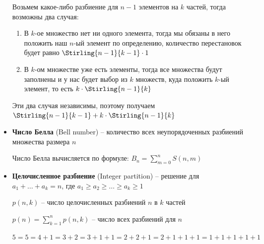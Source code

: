 \documentclass[12pt]{article}
\begin{document}
\begin{itemize}
        Возьмем какое-либо разбиение для $n - 1$ элементов на $k$ частей, тогда возможны два случая:

        \begin{enumerate}
            \item В $k$-ое множество нет ни одного элемента, тогда мы обязаны в него положить наш $n$-ый элемент по определению,
            количество перестановок будет равно $\Stirling{n - 1}{k - 1} \cdot 1$

            \item В $k$-ом множестве уже есть элементы, тогда все множества будут заполнены и у нас будет выбор из $k$ множеств,
            куда положить $k$-ый элемент, то есть $k \cdot \Stirling{n - 1}{k}$
        \end{enumerate}

        Эти два случая независимы, поэтому получаем $\Stirling{n - 1}{k - 1} + k \cdot \Stirling{n - 1}{k}$

        \mediumvspace

        \item \textbf{Число Белла} (Bell number) -- количество всех неупорядоченных разбиений множества размера $n$

        Число Белла вычисляется по формуле: $B_n = \sum_{m=0}^n S(n, m)$

        \mediumvspace

        \hypertarget{integerpartition}{}

        \item \textbf{Целочисленное разбиение} (Integer partition) -- решение для $a_1 + \dots + a_k = n$, где $a_1 \geq a_2 \geq \dots \geq a_k \geq 1$

        $p(n, k)$ -- число целочисленных разбиений $n$ в $k$ частей

        $p(n) = \sum_{k = 1}^n p(n, k)$ -- число всех разбиений для $n$

        \Ex $5 = 5 = 4 + 1 = 3 + 2 = 3 + 1 + 1 = 2 + 2 + 1 = 2 + 1 + 1 + 1 = 1 + 1 + 1 + 1 + 1$

        \mediumvspace

    \end{itemize}

\end{document}
